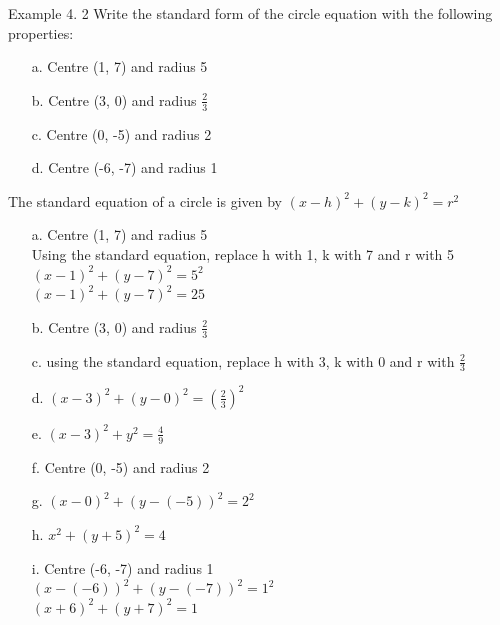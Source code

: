 \begin{example}{Example 4. 2}
Write the standard form of the circle equation with the following properties:
\begin{enumerate}
  \item[a.] Centre (1, 7) and radius 5
  \item[b.] Centre (3, 0) and radius $\frac{2}{3}$
  \item[c.] Centre (0, -5) and radius 2
  \item[d.] Centre (-6, -7) and radius 1
\end{enumerate}

\solution
The standard equation of a circle is given by $(x - h)^2 + (y - k)^2 = r^2$
\begin{enumerate}
  \item[a.] Centre (1, 7) and radius 5\\
  Using the standard equation, replace h with 1, k with 7 and r with 5\\
  $(x - 1)^2 + (y - 7)^2 = 5^2$\\
  $(x - 1)^2 + (y - 7)^2 = 25$
  \item[b.] Centre (3, 0) and radius $\frac{2}{3}$
  \item[c.] using the standard equation, replace h with 3, k with 0 and r with $\frac{2}{3}$
  \item[d.] $(x - 3)^2 + (y - 0)^2 = \left(\frac{2}{3}\right)^2$
  \item[e.] $(x - 3)^2 + y^2 = \frac{4}{9}$
  \item[f.] Centre (0, -5) and radius 2
  \item[g.] $(x - 0)^2 + (y - (-5))^2 = 2^2$
  \item[h.] $x^2 + (y + 5)^2 = 4$
  \item[i.] Centre (-6, -7) and radius 1\\
  $(x - (-6))^2 + (y - (-7))^2 = 1^2$\\
  $(x + 6)^2 + (y + 7)^2 = 1$
\end{enumerate}
\end{example}

